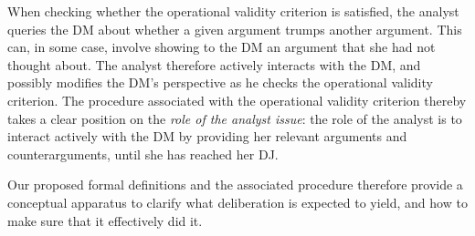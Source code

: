 \documentclass[version=3.21, pagesize, twoside=off, bibliography=totoc, DIV=calc, fontsize=12pt, a4paper, french, english]{scrartcl}
\begin{document}
When checking whether the operational validity criterion is satisfied, the analyst queries the \ac{DM} about whether a given argument trumps another argument. This can, in some case, involve showing to the \ac{DM} an argument that she had not thought about. The analyst therefore actively interacts with the \ac{DM}, and possibly modifies the \ac{DM}’s perspective as he checks the operational validity criterion. 
The procedure associated with the operational validity criterion thereby takes a clear position on the \emph{role of the analyst issue}: the role of the analyst is to interact actively with the \ac{DM} by providing her relevant arguments and counterarguments, until she has reached her \ac{DJ}.

Our proposed formal definitions and the associated procedure therefore provide a conceptual apparatus to clarify what deliberation is expected to yield, and how to make sure that it effectively did it. 
\end{document}
